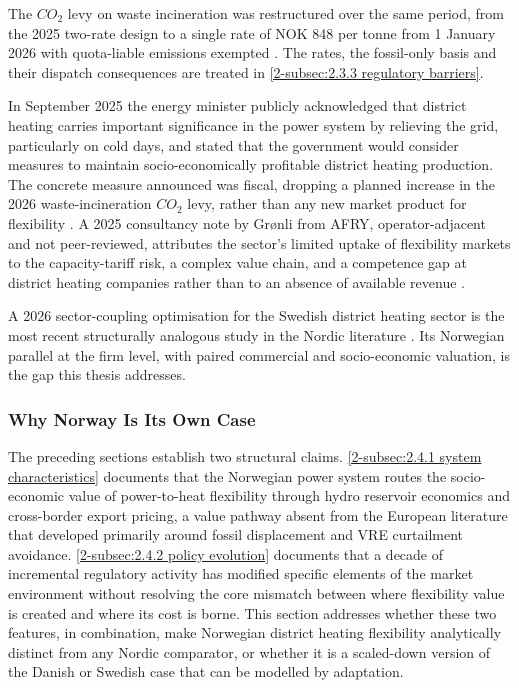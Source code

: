 The $CO_2$ levy on waste incineration was restructured over the same period, from the 2025 two-rate design to a single rate of NOK 848 per tonne from 1 January 2026 with quota-liable emissions exempted \cite{stortinget_stortingsvedtak_2025}. The rates, the fossil-only basis and their dispatch consequences are treated in \autoref{2-subsec:2.3.3 regulatory barriers}.

In September 2025 the energy minister publicly acknowledged that district heating carries important significance in the power system by relieving the grid, particularly on cold days, and stated that the government would consider measures to maintain socio-economically profitable district heating production. The concrete measure announced was fiscal, dropping a planned increase in the 2026 waste-incineration $CO_2$ levy, rather than any new market product for flexibility \cite{hovland_varsler_2025}. A 2025 consultancy note by Grønli from AFRY, operator-adjacent and not peer-reviewed, attributes the sector's limited uptake of flexibility markets to the capacity-tariff risk, a complex value chain, and a competence gap at district heating companies rather than to an absence of available revenue \cite{gronli_hvor_2025}.

A 2026 sector-coupling optimisation for the Swedish district heating sector is the most recent structurally analogous study in the Nordic literature \cite{atabaki_optimising_2026}. Its Norwegian parallel at the firm level, with paired commercial and socio-economic valuation, is the gap this thesis addresses.


\subsubsection{Why Norway Is Its Own Case}
\label{2-subsec:2.4.3 norwegian own case}

The preceding sections establish two structural claims. \autoref{2-subsec:2.4.1 system characteristics} documents that the Norwegian power system routes the socio-economic value of power-to-heat flexibility through hydro reservoir economics and cross-border export pricing, a value pathway absent from the European literature that developed primarily around fossil displacement and VRE curtailment avoidance. \autoref{2-subsec:2.4.2 policy evolution} documents that a decade of incremental regulatory activity has modified specific elements of the market environment without resolving the core mismatch between where flexibility value is created and where its cost is borne. This section addresses whether these two features, in combination, make Norwegian district heating flexibility analytically distinct from any Nordic comparator, or whether it is a scaled-down version of the Danish or Swedish case that can be modelled by adaptation.

